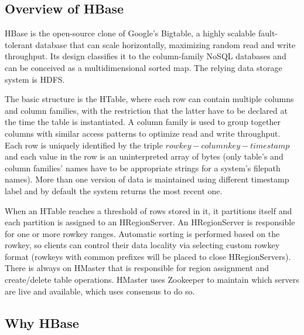 \documentclass{lmproj}
\begin{document}
\subsection{Overview of HBase}
HBase is the open-source clone of Google's Bigtable, a highly scalable fault-tolerant database that can scale horizontally, maximizing random read and write throughput. Its design classifies it to the column-family NoSQL databases and can be conceived as a multidimensional sorted map. The relying data storage system is HDFS.

The basic structure is the HTable, where each row can contain multiple columns and column families, with the restriction that the latter have to be declared at the time the table is instantiated. A column family is used to group together columns with similar access patterns to optimize read and write throughput. Each row is uniquely identified by the triple $row key-column key-timestamp$ and each value in the row is an uninterpreted array of bytes (only table's and column families' names have to be appropriate strings for a system's filepath names). More than one version of data is maintained using different timestamp label and by default the system returns the most recent one.

When an HTable reaches a threshold of rows stored in it, it partitions itself and each partition is assigned to an HRegionServer. An HRegionServer is responsible for one or more rowkey ranges. Automatic sorting is performed based on the rowkey, so clients can control their data locality via selecting custom rowkey format (rowkeys with common prefixes will be placed to close HRegionServers). There is always on HMaster that is responsible for region assignment and create/delete table operations. HMaster uses Zookeeper to maintain which servers are live and available, which uses consensus to do so.

\subsection{Why HBase}
\end{document}
